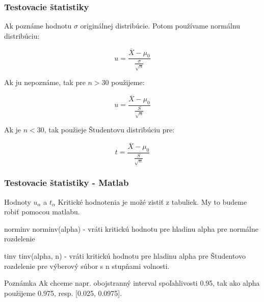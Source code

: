 \documentclass{beamer}
\begin{document}
\begin{frame}
\frametitle{Testovacie štatistiky}

Ak poznáme hodnotu $\sigma$ originálnej distribúcie. Potom používame normálnu distribúciu:

\begin{equation*}
u = \frac{\overline{X} - \mu_0}{\frac{\sigma}{\sqrt{n}}}
\end{equation*}

Ak ju nepoznáme, tak pre $n > 30$ použijeme:

\begin{equation*}
u = \frac{\overline{X} - \mu_0}{\frac{S}{\sqrt{n}}}
\end{equation*}

Ak je $n < 30$, tak použieje Študentovu distribúciu pre:

\begin{equation*}
t = \frac{\overline{X} - \mu_0}{\frac{S}{\sqrt{n}}}
\end{equation*}

\end{frame}


\begin{frame}
\frametitle{Testovacie štatistiky - Matlab}

\begin{block}{Hodnoty $u_{\alpha}$ a $t_{\alpha}$}
Kritické hodnotenia je možé zistiť z tabuliek. My to budeme robiť pomocou matlabu.
\end{block}

\begin{block}{norminv}
norminv(alpha) - vráti kritickú hodnotu pre hladinu alpha pre normálne rozdelenie
\end{block}

\begin{block}{tinv}
tinv(alpha, n) - vráti kritickú hodnotu pre hladinu alpha pre Študentovo rozdelenie pre výberový súbor s n stupňami volnosti.
\end{block}

\begin{block}{Poznámka}
Ak chceme napr. obojstranný interval spoľahlivosti 0.95, tak ako alpha použijeme 0.975, resp. [0.025, 0.0975].
\end{block}
\end{frame}
\end{document}
